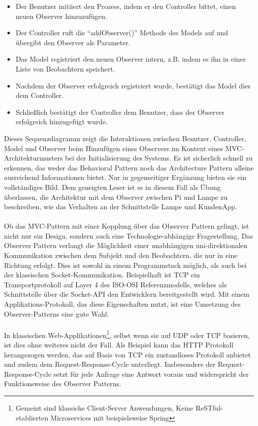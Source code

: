 \documentclass[../vs-script-first-v01.tex]{subfiles}
\begin{document}
\begin{itemize}
\item Der Benutzer initiiert den Prozess, indem er den Controller bittet, einen neuen Observer hinzuzufügen.
\item Der Controller ruft die \enquote{addObserver()} Methode des Models auf und übergibt den Observer als Parameter.
\item Das Model registriert den neuen Observer intern, z.B. indem es ihn in einer Liste von Beobachtern speichert.
\item Nachdem der Observer erfolgreich registriert wurde, bestätigt das Model dies dem Controller.
\item Schließlich bestätigt der Controller dem Benutzer, dass der Observer erfolgreich hinzugefügt wurde.
\end{itemize}
Dieses Sequenzdiagramm zeigt die Interaktionen zwischen Benutzer, Controller, Model und Observer beim Hinzufügen eines Observers im Kontext eines MVC-Architekturmusters bei der Initialisierung des Systems. Es ist sicherlich schnell zu erkennen, das weder das Behavioral Pattern noch das Architecture Pattern alleine ausreichend Informationen bietet. Nur in gegenseitiger Ergänzung bieten sie ein vollständiges Bild. Dem geneigten Leser ist es in diesem Fall als Übung überlassen, die Architektur mit dem Observer zwischen Pi und Lampe zu beschreiben, wie das Verhalten an der Schnittstelle Lampe und KundenApp. 
\\\\
Ob das MVC-Pattern mit einer Kopplung über das Observer Pattern gelingt, ist nicht nur ein Design, sondern auch eine Technologie-abhängige Fragestellung. Das Observer Pattern verlangt die Möglichkeit einer unabhängigen uni-direktionalen Kommunikation zwischen dem Subjekt und den Beobachtern, die nur in eine Richtung erfolgt. Dies ist sowohl in einem Programmstack möglich, als auch bei der klassischen Socket-Kommunikation. Beispielhaft ist TCP ein Transportprotokoll auf Layer 4 des ISO-OSI Referenzmodells, welches als Schnittstelle über die Socket-API den Entwicklern bereitgestellt wird. Mit einem Applikations-Protokoll, das diese Eigenschaften nutzt, ist eine Umsetzung des Observer-Patterns eine gute Wahl. 
\\\\
In klassischen Web-Applikationen\footnote{Gemeint sind klassiche Client-Server Anwendungen, Keine ReSTful-etablierten Microservices mit beispielsweise Spring}, selbst wenn sie auf UDP oder TCP basieren, ist dies ohne weiteres nicht der Fall. Als Beispiel kann das HTTP Protokoll herangezogen werden, das auf Basis von TCP ein zustandloses Protokoll anbietet und zudem dem Request-Response-Cycle unterliegt. Insbesondere der Request-Response-Cycle setzt für jede Anfrage eine Antwort voraus und widerspricht der Funktionsweise des Observer Patterns.
\end{document}
